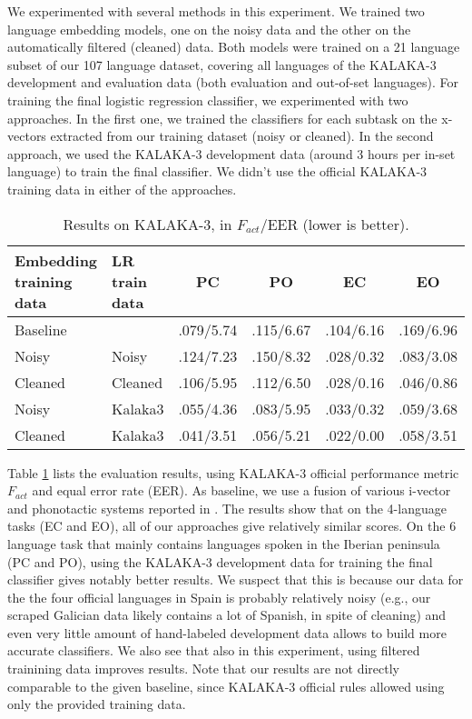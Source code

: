 \documentclass{article}
\begin{document}
We experimented with several methods in this experiment. We trained two language embedding models, one on the noisy data and the other on the automatically filtered (cleaned) data. Both models were  trained on a 21 language subset of our  107 language dataset, covering all languages of the KALAKA-3 development and evaluation data (both evaluation and out-of-set languages).
For training the final logistic regression classifier, we experimented with two approaches.
In the first one, we trained the classifiers for each subtask on the x-vectors extracted from  our training dataset (noisy or cleaned). In the second approach, we used the KALAKA-3 development data (around 3 hours per in-set language) to train the final classifier. We didn't use the official KALAKA-3 training data in either of the approaches.

\begin{table}[tb]
\footnotesize
\caption{Results on KALAKA-3, in $F_{act}$/EER (lower is better).  }
\label{tab:kalaka3}
\centering
\begin{tabular}{p{1.0cm}p{0.8cm}cccc}
\hline
Embedding training data & LR train data & PC & PO & EC & EO \\
\hline
\multicolumn{2}{l}{Baseline \cite{rodriguez2016kalaka}} & .079/5.74 & .115/6.67 & .104/6.16 & .169/6.96 \\
Noisy & Noisy  &  .124/7.23 & .150/8.32  & .028/0.32 & .083/3.08 \\
Cleaned & Cleaned  &  .106/5.95 & .112/6.50  & .028/0.16 & .046/0.86 \\
Noisy &  Kalaka3 &  .055/4.36 & .083/5.95 & .033/0.32 & .059/3.68 \\
Cleaned  & Kalaka3  &  .041/3.51 &  .056/5.21 & .022/0.00 & .058/3.51 \\
\hline
\end{tabular}
\end{table}

Table \ref{tab:kalaka3} lists the evaluation results, using KALAKA-3 official performance metric $F_{act}$ and equal error rate (EER). As baseline, we use a fusion of various i-vector and phonotactic systems reported in \cite{rodriguez2016kalaka}. The results show that on the 4-language tasks (EC and EO), all of our approaches give relatively similar scores. On the 6 language task that mainly contains languages spoken in the Iberian peninsula (PC and PO), using the KALAKA-3 development data for training the final classifier gives notably better results. We suspect that this is because our data for the the four official languages in Spain is probably relatively noisy (e.g., our scraped Galician data likely contains a lot of Spanish, in spite of cleaning) and even very little amount of hand-labeled development data allows to build more accurate classifiers. We also see that also in this experiment, using filtered trainining data improves results. Note that our results are not directly comparable to the given baseline, since KALAKA-3 official rules allowed  using only the provided training data.
\end{document}

